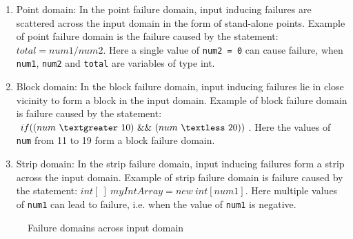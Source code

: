 \begin{enumerate}
\item Point domain: In the point failure domain, input inducing failures are scattered across the input domain in the form of stand-alone points. Example of point failure domain is the failure caused by the statement: $total = num1/num2$. Here a single value of \verb+num2 = 0+ can cause failure, when \verb+num1+, \verb+num2+ and \verb+total+ are variables of type int.
\item Block domain: In the block failure domain, input inducing failures lie in close vicinity to form a block in the input domain. Example of block failure domain is failure caused by the statement: $if ( (num~\textgreater~10)~\&\&~(num~\textless~20) )$. Here the values of \verb+num+ from 11 to 19 form a block failure domain.
\item Strip domain: In the strip failure domain, input inducing failures form a strip across the input domain. Example of strip failure domain is failure caused by the statement: $int[~]~myIntArray = new~int[num1]$. Here multiple values of \verb+num1+ can lead to failure, i.e. when the value of \verb+num1+ is negative.
\end{enumerate}
\smallskip
\begin{figure} [H]
\centering
{}

\caption{Failure domains across input domain~\cite{chan1996proportional}}
\label{fig:patterns2}
\end{figure}

